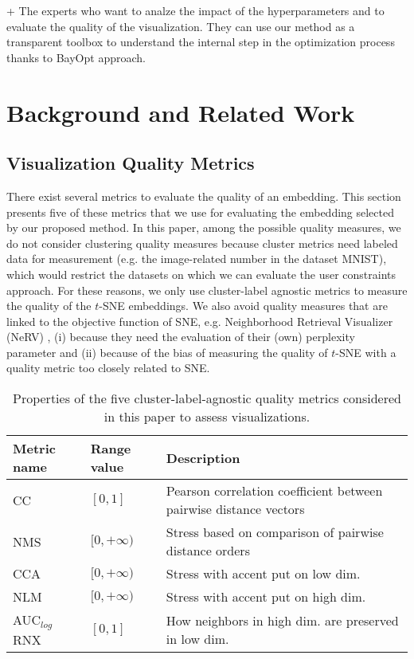 + The experts who want to analze the impact of the hyperparameters and to evaluate the quality of the visualization.
They can use our method as a transparent toolbox to understand the internal step in the optimization process thanks to BayOpt approach.


\section{Background and Related Work}

\subsection{Visualization Quality Metrics}
There exist several metrics to evaluate the quality of an embedding. This section presents five of these metrics that we use for evaluating the embedding selected by our proposed method. 
In this paper, among the possible quality measures, we do not consider clustering quality measures because cluster metrics need labeled data for measurement (e.g. the image-related number in the dataset MNIST), which would restrict the datasets on which we can evaluate the user constraints approach.
For these reasons, we only use cluster-label agnostic metrics to measure the quality of the $t$-SNE embeddings.
We also avoid quality measures that are linked to the objective function of SNE, e.g. Neighborhood Retrieval Visualizer (NeRV) \cite{venna2010}, (i) because they need the evaluation of their (own) perplexity parameter and (ii) because of the bias of measuring the quality of $t$-SNE with a quality metric too closely related to SNE.

\begin{table}
\renewcommand{\arraystretch}{1.0}
\caption{Properties of the five cluster-label-agnostic quality metrics considered in this paper to assess visualizations.}\label{tab:metrics}
\begin{tabular}{p{1.3cm} p{1.1cm} p{4.4cm}}
\hline
Metric name &  Range value & Description\\
\hline \hline
CC & $[0, 1]$ & Pearson correlation coefficient between pairwise distance vectors\\
NMS & $[0, +\infty)$ & Stress based on comparison of pairwise distance orders\\
CCA & $[0, +\infty)$ & Stress with accent put on low dim.\\
NLM & $[0, +\infty)$ & Stress with accent put on high dim.\\
AUC$_{log}$RNX & $[0, 1]$ & How neighbors in high dim. are preserved in low dim.\\
\hline
\end{tabular}
\end{table}

